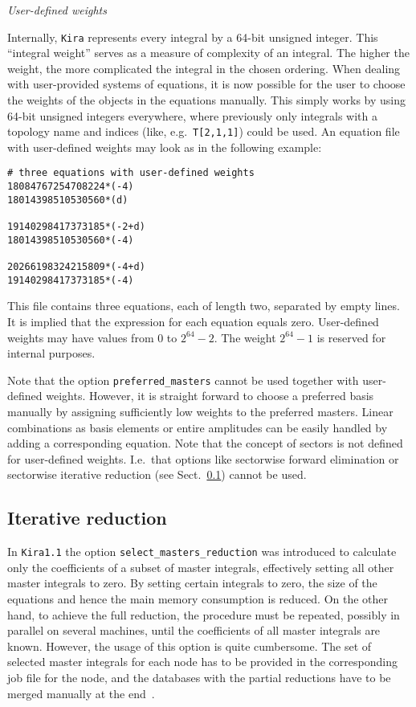 \documentclass[11pt,a4paper,DIV=11,numbers=noenddot,parskip=half]{scrartcl}
\newcommand{\code}[1]{\texttt{#1}}
\newcommand*{\kira}{\code{Kira}}
\begin{document}
\medskip\pagebreak[2]
\noindent
\textit{User-defined weights}

Internally, \kira{} represents every integral by a 64-bit unsigned integer.
This ``integral weight'' serves as a measure of complexity of an integral.
The higher the weight, the more complicated the integral in the chosen
ordering.
When dealing with user-provided systems of equations, it is now possible
for the user to choose the weights of the objects in the equations manually.
This simply works by using 64-bit unsigned integers everywhere, where
previously only integrals with a topology name and indices (like,
e.g.\ \code{T[2,1,1]}) could be used.
An equation file with user-defined weights may look as in the following example:
\begin{verbatim}
# three equations with user-defined weights
18084767254708224*(-4)
18014398510530560*(d)

19140298417373185*(-2+d)
18014398510530560*(-4)

20266198324215809*(-4+d)
19140298417373185*(-4)
\end{verbatim}
This file contains three equations, each of length two, separated by empty lines.
It is implied that the expression for each equation equals zero.
User-defined weights may have values from 0 to $2^{64}-2$.
The weight $2^{64}-1$ is reserved for internal purposes.

Note that the option \code{preferred\_masters} cannot be used together with
user-defined weights.
However, it is straight forward to choose a preferred basis manually by
assigning sufficiently low weights to the preferred masters.
Linear combinations as basis elements or entire amplitudes can be easily
handled by adding a corresponding equation.
Note that the concept of sectors is not defined for user-defined weights.
I.e.\ that options like sectorwise forward elimination or sectorwise
iterative reduction (see Sect.~\ref{subsect:iterativ reduction}) cannot be used.


\subsection{Iterative reduction}
\label{subsect:iterativ reduction}

In \kira{}\;\code{1.1} the option \code{select\_masters\_reduction} \cite{kira:1_1} was introduced to calculate only the coefficients of a subset of master integrals, effectively setting all other master integrals to zero.
By setting certain integrals to zero, the size of the equations and hence the main memory consumption is reduced.
On the other hand, to achieve the full reduction, the procedure must be repeated, possibly in parallel on several machines, until the coefficients of all master integrals are known.
However, the usage of this option is quite cumbersome.
The set of selected master integrals for each node has to be provided in the corresponding job file for the node, and the databases with the partial reductions have to be merged manually at the end~\cite{Maierhofer:2018gpa}.
\end{document}
